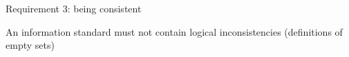\begin{frame}
  \epigraph{\huge Requirement 3: being consistent}{An information standard must not contain logical inconsistencies (definitions of empty sets)}
\end{frame}
